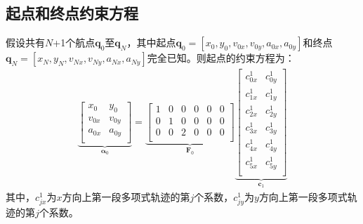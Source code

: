 \documentclass[master,academic]{ysuthesis} %
\begin{document}
		\subsection{起点和终点约束方程} 
		假设共有$N$+1个航点$\bm{q}_{0}$至$\bm{q}_{N}$，其中起点$\bm{q}_{0}=[x_0,y_0,v_{0x},v_{0y},a_{0x},a_{0y}]$和终点$\bm{q}_{N}=[x_N,y_N,v_{Nx},v_{Ny},a_{Nx},a_{Ny}]$完全已知。则起点的约束方程为：
		\begin{equation}
			\begin{aligned}
			\underbrace{\begin{bmatrix}
				x_0&		y_0\\
				v_{0x}&		v_{0y}\\
				a_{0x}&		a_{0y}\\
			\end{bmatrix}}_{\bm{\alpha}_0} 
			 = \underbrace{\begin{bmatrix}
				1&		0&		0&		0&		0&		0\\
				0&		1&		0&		0&		0&		0\\
				0&		0&		2&		0&		0&		0\\
			\end{bmatrix}}_{\bm{F}_0}
			\underbrace{\begin{bmatrix}
				c_{0x}^{1}&		c_{0y}^{1}\\
				c_{1x}^{1}&		c_{1y}^{1}\\
				c_{2x}^{1}&		c_{2y}^{1}\\
				c_{3x}^{1}&		c_{3y}^{1}\\
				c_{4x}^{1}&		c_{4y}^{1}\\
				c_{5x}^{1}&		c_{5y}^{1}\\
			\end{bmatrix}}_{\bm{c}_1}
			\end{aligned}
		\end{equation}
		其中，$c^1_{jx}$为$x$方向上第一段多项式轨迹的第$j$个系数，$c^1_{jy}$为$y$方向上第一段多项式轨迹的第$j$个系数。
\end{document}
